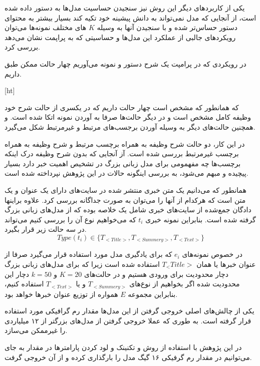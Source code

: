 یکی از کاربردهای دیگر این روش نیز سنجیدن حساسیت‌ مدل‌ها به دستور داده شده است، از آنجایی که مدل نمی‌تواند به دانش پیشینه خود تکیه کند بسیار بیشتر به محتوای دستور حساس‌تر شده و با سنجیدن آنها به وسیله
$K$
های مختلف نمونه‌ها می‌توان رویکرد‌های جالبی از عملکرد این مدل‌ها و حساسیتی که به پراپمت نشان می‌دهد بررسی کرد.

در رویکردی که در پرامپت یک شرح دستور و نمونه می‌آوریم چهار حالت ممکن طبق  داریم.

[ht]

که همانطور که مشخص است چهار حالت داریم که در یکسری از حالت شرح خود وظیفه کامل مشخص است و در دیگر حالت‌ها صرفا به آوردن نمونه اتکا شده است. و همچنین حالت‌های دیگر به وسیله آوردن برجسب‌های مرتبط و غیرمرتبط شکل می‌گیرد.

در این کار، دو حالت شرح وظیفه به همراه برچسب مرتبط و شرح وظیفه به همراه برچسب غیرمرتبط بررسی شده است. آز آنجایی که بدون شرح وظیفه درک اینکه برچسب‌ها چه مفهمومی برای مدل زبانی بزرگ در تشخیص اهمیت خبر دارد بسیار پیچیده و مبهم می‌شود، به بررسی اینگونه حالات در این پژوهش نپرداخته شده است.

همانطور که می‌دانیم یک متن خبری منتشر شده در سایت‌های دارای یک عنوان و یک متن است که هرکدام از آنها را می‌توان به صورت جداگانه بررسی کرد. علاوه براینها دادگان جمع‌شده از سایت‌های خبری شامل یک خلاصه بوده که از مدل‌های زبانی بزرگ گرفته شده است. بنابراین نمونه خبری
$t_i$
که می‌خواهیم نوع آن را بررسی کنیم می‌تواند در سه حالت زیر قرار بگیرد.
\begin{equation}
    Type(t_i) \in \{T_{<Title>}, T_{<Summery>}, T_{<Text>}\}
\end{equation}

در خصوص نمونه‌های
$e_i$
که برای یادگیری مدل مورد استفاده قرار می‌گیرد صرفا از عنوان خبرها یا همان
$T_<Title>$
استفاده شده است زیرا که برای مد‌ل‌های زبانی بزرگ دچار محدودیت برای ورودی هستیم و در حالت‌های
$K = 20$
 و
$k = 50$
دچار این محدودیت شده اگر بخواهیم از نوع‌های
$T_{<Summery>}$
و یا
$T_{<Text>}$
استفاده کنیم، بنابراین مجموعه
$E$
همواره از توزیع عنوان خبرها خواهد بود.

یکی از چالش‌های اصلی خروجی گرفتن از این مدل‌ها مقدار رم گرافیکی مورد استفاده قرار گرفته است. به طوری که عملا خروجی گرفتن از مدل‌های بزرگتر از ۱۲ میلیاردی را غیرممکن می‌سازد.

در این پژوهش با استفاده از روش و تکنینک
و لود کردن پارامترها در مقدار
به جای
می‌توانیم در مقدار رم گرفیکی ۱۶ گیگ مدل را بارگذاری کرده و از آن خروجی گرفت.

